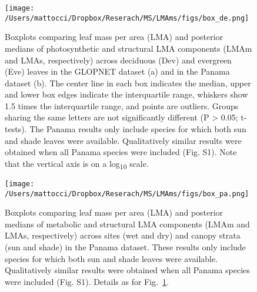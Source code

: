 \documentclass[
  12pt,
  letterpaper,
  DIV=11,
  numbers=noendperiod]{scrartcl}
\begin{document}
\newpage

\begin{figure}

{\centering \texttt{[image: /Users/mattocci/Dropbox/Reserach/MS/LMAms/figs/box\_de.png]}

}

\caption{\label{fig-box_de}Boxplots comparing leaf mass per area (LMA)
and posterior medians of photosynthetic and structural LMA components
(LMAm and LMAs, respectively) across deciduous (Dev) and evergreen (Eve)
leaves in the GLOPNET dataset (a) and in the Panama dataset (b). The
center line in each box indicates the median, upper and lower box edges
indicate the interquartile range, whiskers show 1.5 times the
interquartile range, and points are outliers. Groups sharing the same
letters are not significantly different (P \textgreater{} 0.05;
t-tests). The Panama results only include species for which both sun and
shade leaves were available. Qualitatively similar results were obtained
when all Panama species were included (Fig. S1). Note that the vertical
axis is on a log\textsubscript{10} scale.}

\end{figure}

\newpage

\begin{figure}

{\centering \texttt{[image: /Users/mattocci/Dropbox/Reserach/MS/LMAms/figs/box\_pa.png]}

}

\caption{\label{fig-box_pa}Boxplots comparing leaf mass per area (LMA)
and posterior medians of metabolic and structural LMA components (LMAm
and LMAs, respectively) across sites (wet and dry) and canopy strata
(sun and shade) in the Panama dataset. These results only include
species for which both sun and shade leaves were available.
Qualitatively similar results were obtained when all Panama species were
included (Fig. S1). Details as for Fig.~\ref{fig-box_de}.}

\end{figure}

\newpage
\end{document}

